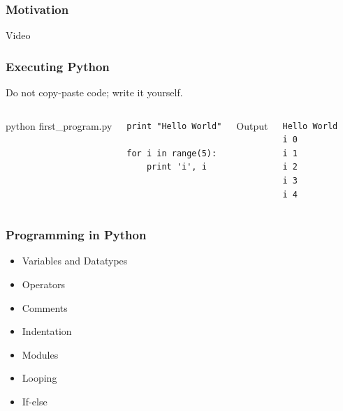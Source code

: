 \begin{frame}[fragile]

    \frametitle{Motivation}

    \begin{center}
        Video %
    \end{center}

\end{frame}


\begin{frame}[fragile]

    \frametitle{Executing Python}

    \begin{center}
        Do not copy-paste code; write it yourself.
    \end{center}

    \begin{columns}[t]


            \begin{center}
                python first\_program.py
            \end{center}

\begin{lstlisting}
print "Hello World"

for i in range(5):
    print 'i', i
\end{lstlisting}


            \begin{center}
                Output
            \end{center}

\begin{lstlisting}
Hello World
i 0
i 1
i 2
i 3
i 4
\end{lstlisting}


    \end{columns}


\end{frame}



\begin{frame}[fragile]

    \frametitle{Programming in Python}

    \begin{itemize}
        \item Variables and Datatypes
        \item Operators
        \item Comments
        \item Indentation
        \item Modules
        \item Looping
        \item If-else
    \end{itemize}

\end{frame}


